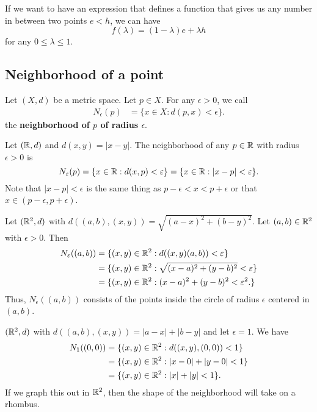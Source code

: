 \documentclass[a4paper]{report}
\begin{document}
\begin{remark}
    If we want to have an expression that defines a function that gives us any number in between two points \( e<h  \), we can have
    \[ f(\lambda) =  (1-\lambda)e + \lambda h   \]
    for any \( 0 \leq \lambda \leq 1  \).
\end{remark}

\subsection{Neighborhood of a point}

\begin{definition}[Neighborhood]
   Let \( (X,d) \) be a metric space. Let \( p \in X  \). For any \( \epsilon > 0  \), we call  
   \begin{align*}
       {N}_{\epsilon}(p) &= \{ x \in X : d(p,x) < \epsilon \}.  
   \end{align*}
   the \textbf{neighborhood of \( p \) of radius \( \epsilon \)}. 
\end{definition}

\begin{eg}
    Let \( (\mathbb{R}, d) \) and \( d(x,y) = | x - y  |  \). The neighborhood of any \( p \in \mathbb{R}  \) with radius \( \epsilon > 0  \) is
    \[  {N}_{\varepsilon}(p) = \{ x \in \mathbb{R} : d(x,p) < \varepsilon \}  = \{ x \in \mathbb{R} : |  x - p  |  < \varepsilon \}.  \]
    Note that \( | x - p  |  < \epsilon  \) is the same thing as \( p - \epsilon < x < p + \epsilon  \) or that \( x \in (p - \epsilon, p + \epsilon) \).
\end{eg}

\begin{eg}
    Let \( (\mathbb{R}^{2}, d) \) with \( d((a,b), (x,y)) = \sqrt{ (a-x)^{2} + (b-y)^{2} }  \).
    Let \( (a,b) \in \mathbb{R}^{2} \) with \( \epsilon > 0  \). Then
    \begin{align*} 
    {N}_{\varepsilon}((a,b)) &= \{ (x,y) \in \mathbb{R}^{2} : d((x,y)(a,b)) < \varepsilon \}  \\
                          &= \{ (x,y) \in \mathbb{R}^{2} : \sqrt{ (x-a)^{2} + (y-b)^{2} } < \varepsilon \} \\
                          &= \{ (x,y) \in \mathbb{R}^{2} : (x-a)^{2} + (y-b)^{2} < \varepsilon^{2}. \} 
\end{align*}
Thus, \( {N}_{\epsilon}((a,b))  \) consists of the points inside the circle of radius \( \epsilon  \) centered in \( (a,b) \).
\end{eg}

\begin{eg}
    \( (\mathbb{R}^{2}, d) \) with \( d((a,b), (x,y)) = | a - x  |  + |  b - y  |  \) and let \( \epsilon = 1  \). We have
    \begin{align*}
    {N}_{1}((0,0)) &= \{ (x,y) \in \mathbb{R}^{2} : d((x,y),(0,0)) < 1  \}  \\
                &= \{ (x,y) \in \mathbb{R}^{2} : | x - 0  |  + | y - 0  |  < 1  \} \\
                   &= \{ (x,y) \in \mathbb{R}^{2} : | x  |  + | y  |  < 1  \}.
\end{align*}
If we graph this out in \( \mathbb{R}^{2} \), then the shape of the neighborhood will take on a rhombus.
\end{eg}
\end{document}

